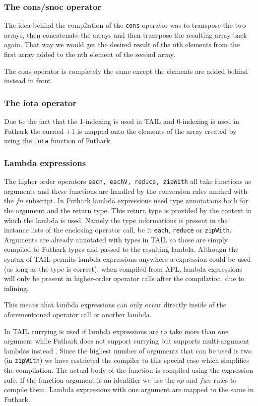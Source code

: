 \documentclass[11pt]{article}
\begin{document}
\subsubsection{The cons/snoc operator}
The idea behind the compilation of the {\tt cons} operator was to transpose the two arrays,
then concatenate the arrays and then transpose the resulting array back again.
That way we would get the desired result of the nth elements from the first array added to the nth element of the second array.

The cons operator is completely the same except the elements are added behind instead in front.

\subsubsection{The iota operator} 
Due to the fact that the 1-indexing is used in TAIL and 0-indexing is used in Futhark the curried $+1$ is mapped onto the elements of the array created by using the {\tt iota} function of Futhark. 

\subsubsection{Lambda expressions} 
The higher order operators {\tt each, eachV, reduce, zipWith} all take functions as arguments and these functions are handled by the
conversion rules marked with the $fn$ subscript. 
In Futhark lambda expressions need type annotations both for the argument and the return type\cite{TroelsHenriksen}.
This return type is provided by the context in which the lambda is used.
Namely the type informations is present in the instance lists of the enclosing operator call, be it {\tt each}, {\tt reduce} or {\tt zipWith}.
Arguments are already annotated with types in TAIL so those are simply compiled to Futhark types and passed to the resulting lambda.
Althougn the syntax of TAIL permits lambda expressions anywhere a  expression could be used (as long as the type is correct),
when compiled from APL, lambda expressions will only be present in higher-order operator calls after the compilation, due to inlining.

This means that lambda expressions can only occur directly inside of the aforementioned operator call or another lambda.

In TAIL currying is used if lambda expressions are to take more than one argument while Futhark does not support currying but
supports multi-argument lambdas instead \cite{ElsmanDybdal:Array:2014}.
Since the highest number of arguments that can be used is two (in {\tt zipWith}) we have
restricted the compiler to this special case which simplifies the compilation.
The actual body of the function is compiled using the expression rule.
If the function argument is an identifier we use the $op$ and $fun$ rules to compile them.
Lambda expressions with one argument are mapped to the same in Futhark.
\end{document}

